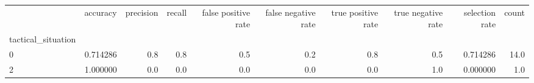 \begin{tabular}{lrrrrrrrrr}
\toprule
{} &  accuracy &  precision &  recall &  false positive rate &  false negative rate &  true positive rate &  true negative rate &  selection rate &  count \\
tactical\_situation &           &            &         &                      &                      &                     &                     &                 &        \\
\midrule
0                  &  0.714286 &        0.8 &     0.8 &                  0.5 &                  0.2 &                 0.8 &                 0.5 &        0.714286 &   14.0 \\
2                  &  1.000000 &        0.0 &     0.0 &                  0.0 &                  0.0 &                 0.0 &                 1.0 &        0.000000 &    1.0 \\
\bottomrule
\end{tabular}
